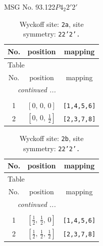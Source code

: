 \documentclass[fleqn,8pt]{jsarticle}
\begin{document}
\setcounter{MaxMatrixCols}{32}

\renewcommand{\tablename}{Table~}
\renewcommand{\figurename}{Figure~}
\begin{center}
\LARGE
MSG No. 93.122\quad$P4_{2}2'2'$
\end{center}
\renewcommand{\arraystretch}{1.2}
\begin{longtable}{ccc}
\caption{Wyckoff site: {\tt 2a}, site symmetry: {\tt 22'2'.}}
 \\
 \hline \hline
No. & position & mapping \\ \hline \endfirsthead

\multicolumn{2}{l}{\tablename\ \thetable{}} \\
 \hline \hline
No. & position & mapping \\ \hline \endhead

 \hline \hline
\multicolumn{2}{r}{\footnotesize\it continued ...} \\ \endfoot

 \hline \hline
\multicolumn{2}{r}{} \\ \endlastfoot

1 & $\left[ 0,\, 0,\, 0 \right]$ & {\tt [1,4,5,6]} \\ \hline
2 & $\left[ 0,\, 0,\, \frac{1}{2} \right]$ & {\tt [2,3,7,8]} \\
\end{longtable}
\renewcommand{\arraystretch}{1.2}
\begin{longtable}{ccc}
\caption{Wyckoff site: {\tt 2b}, site symmetry: {\tt 22'2'.}}
 \\
 \hline \hline
No. & position & mapping \\ \hline \endfirsthead

\multicolumn{2}{l}{\tablename\ \thetable{}} \\
 \hline \hline
No. & position & mapping \\ \hline \endhead

 \hline \hline
\multicolumn{2}{r}{\footnotesize\it continued ...} \\ \endfoot

 \hline \hline
\multicolumn{2}{r}{} \\ \endlastfoot

1 & $\left[ \frac{1}{2},\, \frac{1}{2},\, 0 \right]$ & {\tt [1,4,5,6]} \\ \hline
2 & $\left[ \frac{1}{2},\, \frac{1}{2},\, \frac{1}{2} \right]$ & {\tt [2,3,7,8]} \\
\end{longtable}
\end{document}
